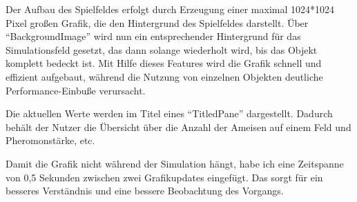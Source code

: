 \documentclass[a4paper,12pt]{scrartcl}
\begin{document}
Der Aufbau des Spielfeldes erfolgt durch Erzeugung einer maximal 1024*1024 Pixel großen Grafik, die den Hintergrund des Spielfeldes darstellt. Über "`BackgroundImage"' wird nun ein entsprechender Hintergrund für das Simulationsfeld gesetzt, das dann solange wiederholt wird, bis das Objekt komplett bedeckt ist. Mit Hilfe dieses Features wird die Grafik schnell und effizient aufgebaut, während die Nutzung von einzelnen Objekten deutliche Performance-Einbuße verursacht.

Die aktuellen Werte werden im Titel eines "`TitledPane"' dargestellt. Dadurch behält der Nutzer die Übersicht über die Anzahl der Ameisen auf einem Feld und Pheromonstärke, etc.

Damit die Grafik nicht während der Simulation hängt, habe ich eine Zeitspanne von 0,5 Sekunden zwischen zwei Grafikupdates eingefügt. Das sorgt für ein besseres Verständnis und eine bessere Beobachtung des Vorgangs.
\end{document}
